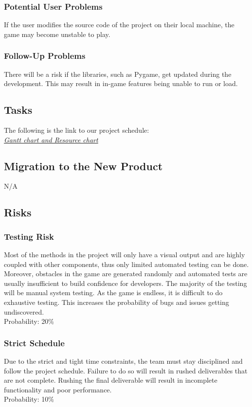\documentclass[12pt, titlepage]{article}
\begin{document}
\subsubsection{Potential User Problems}
If the user modifies the source code of the project on their local machine, the game may become unstable to play. 

\subsubsection{Follow-Up Problems}
There will be a risk if the libraries, such as Pygame, get updated during the development. This may result in in-game features being unable to run or load.
\subsection{Tasks}
The following is the link to our project schedule:\\
\href{https://gitlab.cas.mcmaster.ca/se_3xa3_l3g15/se_3xa3_project/-/tree/master/ProjectSchedule/GanttT-Rex.gan}{\textit{Gantt chart and Resource chart}}

\subsection{Migration to the New Product}
N/A

\subsection{Risks}
\subsubsection{Testing Risk}
Most of the methods in the project will only have a visual output and are highly coupled with other components, thus only limited automated testing can be done. Moreover, obstacles in the game are generated randomly and automated tests are usually insufficient to build confidence for developers. The majority of the testing will be manual system testing. As the game is endless, it is difficult to do exhaustive testing. This increases the probability of bugs and issues getting undiscovered.\\
Probability:  20\%

\subsubsection{Strict Schedule}
Due to the strict and tight time constraints, the team must stay disciplined and follow the project schedule. Failure to do so will result in rushed deliverables that are not complete. Rushing the final deliverable will result in incomplete functionality and poor performance. \\
Probability: 10\%
\end{document}
